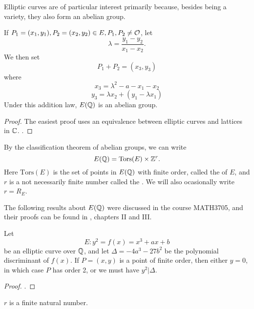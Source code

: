 \documentclass[12pt, a4paper]{amsart}
\begin{document}
Elliptic curves are of particular interest primarily because, besides being
a variety, they also form an abelian group.

\begin{prop}
  If $P_1 = (x_1,y_1), P_2 = (x_2,y_2) \in E, P_1, P_2 \neq {\mathcal O}$, let
  $$\lambda = \frac{y_1-y_2}{x_1-x_2}.$$
  We then set
  \[P_1 + P_2 = (x_3,y_3)\]
  where
  \begin{equation} \label{eq:addx}
    x_3 = \lambda^2 - a - x_1 - x_2
  \end{equation}
  \begin{equation} \label{eq:addy}
    y_3 = \lambda x_2 + (y_1 - \lambda x_1)
  \end{equation}
  Under this addition law, $E({\mathbb Q})$ is an abelian group.
\end{prop}

\begin{proof}
  The easiest proof uses an equivalence between elliptic curves and lattices
  in ${\mathbb C}$. \cite[See][Chapter I, sections 6-7]{modular}.
\end{proof}

\begin{defn}
  By the classification theorem of abelian groups, we can write
\[E({\mathbb Q}) =
  \text{Tors}(E) \times {\mathbb Z}^r. \]
Here $\text{Tors}(E)$ is the set of points in
$E({\mathbb Q})$ with finite
order, called the  of $E$,
and $r$ is a not necessarily finite number called the .
We will also ocasionally write $r = R_E$.
\end{defn}

The following results about $E({\mathbb Q})$ were discussed in the course MATH3705,
and their proofs can be found in \cite{rational}, chapters II and III.

\begin{thm} \label{thm:nagelllutz}
  Let
  \[E: y^2 = f(x) = x^3 + ax + b\]
  be an elliptic curve over ${\mathbb Q}$, and let $\Delta = -4a^3 -27b^2$ be the
  polynomial discriminant of $f(x)$. If $P = (x,y)$ is a point of finite order,
  then either $y = 0$, in which case $P$ has order 2, or we must have $y^2 | \Delta$.
\end{thm}

\begin{proof}
  \cite[See][Chapter II, pages 49-56]{rational}.
\end{proof}

\begin{thm}
  $r$ is a finite natural number.
\end{thm}  
\end{document}
